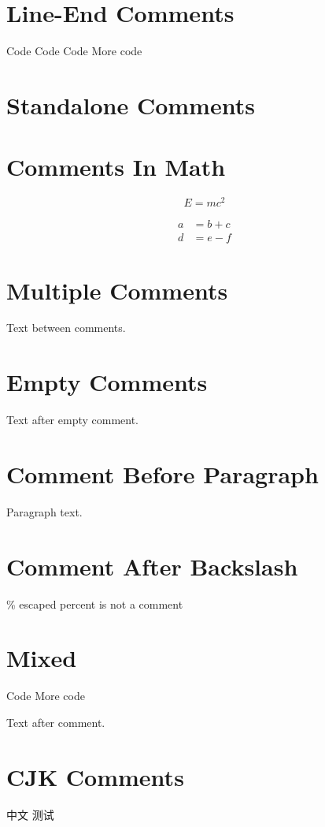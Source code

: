 \documentclass{article}
\begin{document}
\section{Line-End Comments}
Code %
Code %
Code %
More code %

\section{Standalone Comments}

\section{Comments In Math}
\begin{equation}
  E = mc^{2} %
\end{equation}

\begin{align}
  a & = b + c \\
  d & = e - f%
\end{align}

\section{Multiple Comments}
Text between comments.

\section{Empty Comments}
%
Text after empty comment.

\section{Comment Before Paragraph}
Paragraph text.


\section{Comment After Backslash}
\% escaped percent is not a comment

\section{Mixed}
Code %
More code %

Text after comment.

\section{CJK Comments}
中文 %
测试 %
\end{document}
